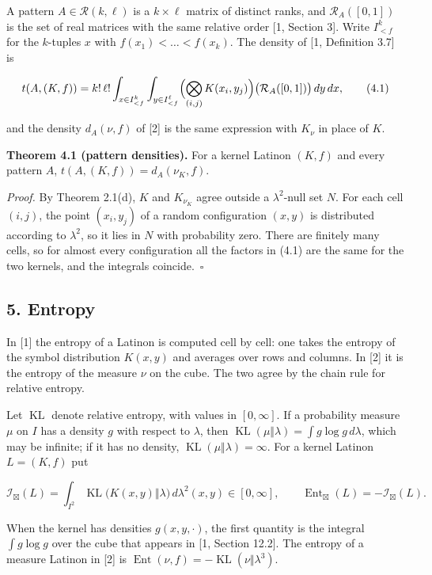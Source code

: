 \documentclass[english,11pt,a4paper]{article}
\begin{document}
A pattern \(A\in\mathcal R(k,\ell)\) is a \(k\times\ell\) matrix of distinct ranks, and \(\mathcal R_A([0,1])\) is the set of real matrices with the same relative order {[}1, Section 3{]}. Write \(I^k_{<f}\) for the \(k\)-tuples \(x\) with \(f(x_1)<\dots<f(x_k)\). The density of {[}1, Definition 3.7{]} is

\nopagebreak[4]
\[t(A,(K,f))=k!\,\ell!\int_{x\in I^k_{<f}}\int_{y\in I^\ell_{<f}}\Bigl(\bigotimes_{(i,j)}K(x_i,y_j)\Bigr)\bigl(\mathcal R_A([0,1])\bigr)\,dy\,dx,\tag{4.1}\]

and the density \(d_A(\nu,f)\) of {[}2{]} is the same expression with \(K_\nu\) in place of \(K\).

\textbf{Theorem 4.1 (pattern densities).} For a kernel Latinon \((K,f)\) and every pattern \(A\), \(t(A,(K,f))=d_A(\nu_K,f)\).

\emph{Proof.} By Theorem 2.1(d), \(K\) and \(K_{\nu_K}\) agree outside a \(\lambda^2\)-null set \(N\). For each cell \((i,j)\), the point \((x_i,y_j)\) of a random configuration \((x,y)\) is distributed according to \(\lambda^2\), so it lies in \(N\) with probability zero. There are finitely many cells, so for almost every configuration all the factors in (4.1) are the same for the two kernels, and the integrals coincide.~\(\square\)

\subsection{5. Entropy}\label{entropy}

In {[}1{]} the entropy of a Latinon is computed cell by cell: one takes the entropy of the symbol distribution \(K(x,y)\) and averages over rows and columns. In {[}2{]} it is the entropy of the measure \(\nu\) on the cube. The two agree by the chain rule for relative entropy.

Let \(\operatorname{KL}\) denote relative entropy, with values in \([0,\infty]\). If a probability measure \(\mu\) on \(I\) has a density \(g\) with respect to \(\lambda\), then \(\operatorname{KL}(\mu\Vert\lambda)=\int g\log g\,d\lambda\), which may be infinite; if it has no density, \(\operatorname{KL}(\mu\Vert\lambda)=\infty\). For a kernel Latinon \(L=(K,f)\) put

\nopagebreak[4]
\[\mathcal I_{\boxtimes}(L)=\int_{I^2}\operatorname{KL}\bigl(K(x,y)\Vert\lambda\bigr)\,d\lambda^2(x,y)\in[0,\infty],\qquad
\operatorname{Ent}_{\boxtimes}(L)=-\mathcal I_{\boxtimes}(L).\tag{5.1}\]

When the kernel has densities \(g(x,y,\cdot)\), the first quantity is the integral \(\int g\log g\) over the cube that appears in {[}1, Section 12.2{]}. The entropy of a measure Latinon in {[}2{]} is \(\operatorname{Ent}(\nu,f)=-\operatorname{KL}(\nu\Vert\lambda^3)\).
\end{document}
